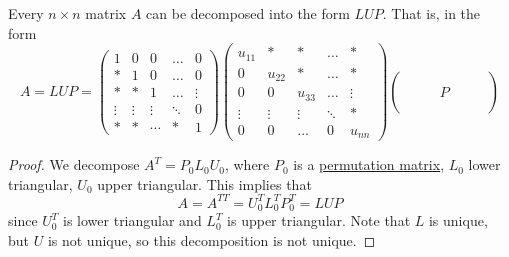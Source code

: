   \begin{corollary}
    \label{thm:lup-decomposition}
    Every $n \times n$ matrix $A$ can be decomposed into the form $L U P$. That is, in the form
    \begin{equation}
      A = L U P = 
      \begin{pmatrix}
      1 & 0 & 0 & \ldots & 0\\
      * & 1 & 0 & \ldots & 0\\
      * & * & 1 & \ldots & \vdots\\
      \vdots & \vdots & \vdots & \ddots & 0\\
      * & * & \cdots & * & 1 
      \end{pmatrix}
      \begin{pmatrix}
      u_{11} & * & * & \ldots & *\\
      0 & u_{22} & * & \ldots & *\\
      0 & 0 & u_{33} & \ldots & \vdots\\
      \vdots & \vdots & \vdots & \ddots & * \\
      0 & 0 & \ldots & 0 & u_{n n} 
      \end{pmatrix}
      \begin{pmatrix}
      \\
      \\
       & & & P & & & \\
      \\
       & 
      \end{pmatrix}
    \end{equation}
  \end{corollary}
  \begin{proof}
    We decompose $A^T = P_0 L_0 U_0$, where $P_0$ is a \hyperref[def:permutation-matrix]{permutation matrix}, $L_0$ lower triangular, $U_0$ upper triangular. This implies that 
    \begin{equation}
      A = A^{T T} = U_0^T L_0^T P_0^T = L U P
    \end{equation}
    since $U_0^T$ is lower triangular and $L_0^T$ is upper triangular. Note that $L$ is unique, but $U$ is not unique, so this decomposition is not unique. 
  \end{proof}

